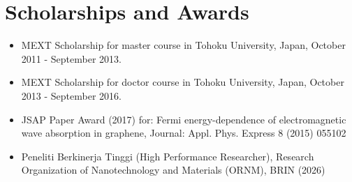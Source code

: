 

\vspace*{\baselineskip}
\section*{Scholarships and Awards}
\begin{itemize}%
\item MEXT Scholarship for master course in Tohoku University, Japan,
  October 2011 - September 2013.
\item MEXT Scholarship for doctor course in Tohoku University, Japan,
  October 2013 - September 2016.
 \item JSAP Paper Award (2017)  for: Fermi energy-dependence of electromagnetic wave absorption in graphene, 
   Journal: Appl. Phys. Express 8 (2015) 055102
\item Peneliti Berkinerja Tinggi (High Performance Researcher), Research Organization of Nanotechnology and Materials (ORNM), BRIN (2026) 
\end{itemize}

